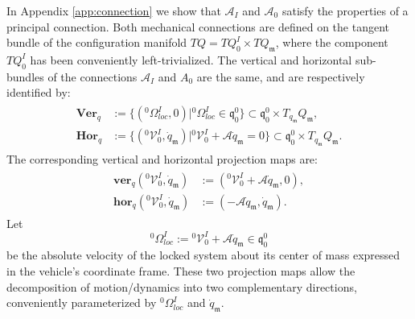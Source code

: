 \documentclass[lettersize,journal]{IEEEtran}
\def \q  {\mathfrak{q}}
\def \m  {\mathfrak{m}}
\def \V {\mathcal{V}}
\def \A {\mathcal{A}}
\def \O {{}^0\Omega^I_{loc}}
\theoremstyle{remark}
\begin{document}
In Appendix \ref{app:connection} we show that $\A_I$ and $\A_0$ satisfy the properties of a principal connection. Both mechanical connections are defined on the tangent bundle of the configuration manifold $TQ=TQ_0^I \times TQ_\m$, where the component $TQ_0^I$ has been conveniently left-trivialized. The vertical and horizontal sub-bundles of the connections $\A_I$ and $A_0$ are the same, and are respectively identified by:
\begin{align}
\begin{split}
    \textbf{Ver}_{q}&:=\{(\O,0)|\O \in \q^0_0\}\subset \q^0_0 \times T_{q_\m}Q_\m,\\
    \textbf{Hor}_{q}&:=\{(^0\V^I_0,\dot q_\m)|{}^0\V^I_0+\A\dot{q}_\m=0\}\subset \q^0_0 \times T_{q_\m}Q_\m.
\end{split}
\end{align}
The corresponding vertical and horizontal projection maps are:
\begin{align}
\begin{split}
   \textbf{ver}_{q}(^0\V^I_0,\dot q_\m)&:=({}^0\V^I_0+\A\dot{q}_\m,0),\\ \textbf{hor}_{q}(^0\V^I_0,\dot q_\m)&:=(-\A\dot{q}_\m,\dot{q}_\m).
\end{split}
\end{align}
Let
\begin{equation}
    \O:={}^0\V^I_0+\A\dot{q}_\m\in\q_0^0
    \label{lockedangularvelocity}
\end{equation} 
be the absolute velocity of the locked system about its center of mass expressed in the vehicle's coordinate frame.  
These two projection maps allow the decomposition of motion/dynamics into two complementary directions, conveniently parameterized by $\O$ and $\dot{q}_\m$.



\end{document}
